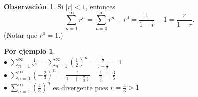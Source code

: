 \documentclass{article}
\theoremstyle{definition}
\theoremstyle{definition}
\newtheorem*{obs}{Observación}
\newtheorem*{ej}{Por ejemplo}
\theoremstyle{remark}
\begin{document}
\begin{obs}
Si $|r|<1$, entonces $$\sum_{n=1}^{\infty}{r^n}=\sum_{n=0}^{\infty}{r^n}-r^0=\frac{1}{1-r}-1=\frac{r}{1-r}.$$
(Notar que $r^0=1$.)
\end{obs}
\begin{ej} \; \\
  $\bullet$ \; $\sum_{n=1}^{\infty}{\frac{1}{2^n}}=\sum_{n=1}^{\infty}{\left(\frac{1}{2}\right)^n}=\frac{\frac{1}{2}}{1-\frac{1}{2}}=1$ \\
  $\bullet$ \; $\sum_{n=0}^{\infty}{\left(-\frac{2}{3}\right)^n}=\frac{1}{1-\left(-\frac{2}{3}\right)}=\frac{1}{\frac{5}{3}}=\frac{3}{5}$ \\

  $ \bullet $ \; $\sum_{n=1}^{\infty}{\left(\frac{4}{3}\right)^n}$ es divergente pues $r=\frac{4}{3}>1$ 

\end{ej}
\end{document}
